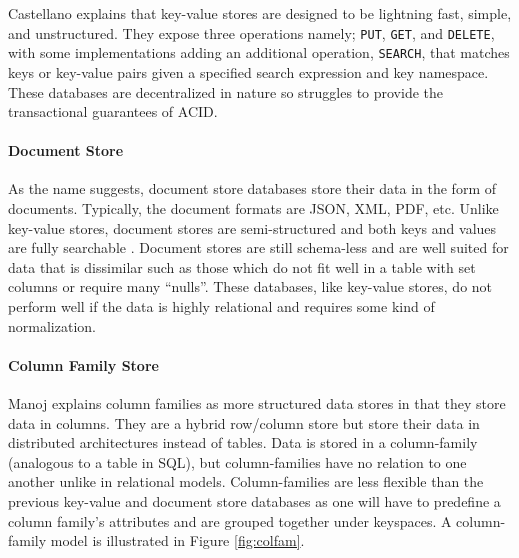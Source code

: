 Castellano \cite{keyvalue-article} explains that key-value stores are designed to be lightning fast, simple, and unstructured. They expose three operations namely; \verb|PUT|, \verb|GET|, and \verb|DELETE|, with some implementations adding an additional operation, \verb|SEARCH|, that matches keys or key-value pairs given a specified search expression and key namespace. These databases are decentralized in nature so struggles to provide the transactional guarantees of ACID.

\paragraph{Document Store}

As the name suggests, document store databases store their data in the form of documents. Typically, the document formats are JSON, XML, PDF, etc. Unlike key-value stores, document stores are semi-structured and both keys and values are fully searchable \cite{nosql-db}. Document stores are still schema-less and are well suited for data that is dissimilar such as those which do not fit well in a table with set columns \cite{docstore-article} or require many ``nulls''. These databases, like key-value stores, do not perform well if the data is highly relational and requires some kind of normalization.

\paragraph{Column Family Store}

Manoj \cite{docstore-article} explains column families as more structured data stores in that they store data in columns. They are a hybrid row/column store but store their data in distributed architectures instead of tables. Data is stored in a column-family (analogous to a table in SQL), but column-families have no relation to one another unlike in relational models. Column-families are less flexible than the previous key-value and document store databases as one will have to predefine a column family's attributes and are grouped together under keyspaces. A column-family model is illustrated in Figure \ref{fig:colfam}.

